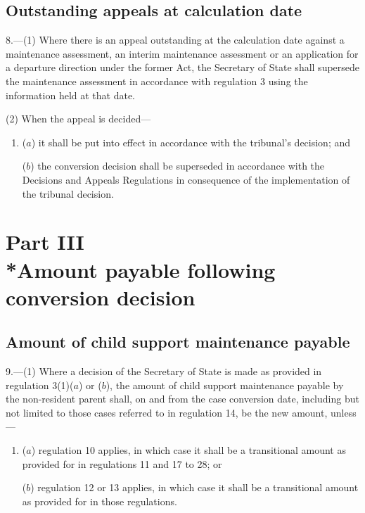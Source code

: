 \documentclass[12pt,a4paper]{article}
\begin{document}
\subsection[8. Outstanding appeals at calculation date]{Outstanding appeals at calculation date}

8.---(1)  Where there is an appeal outstanding at the calculation date against a maintenance assessment, an interim maintenance assessment or an application for a departure direction under the former Act, the Secretary of State shall supersede the maintenance assessment in accordance with regulation 3 using the information held at that date.

(2) When the appeal is decided—
\begin{enumerate}\item[]
($a$) it shall be put into effect in accordance with the tribunal’s decision; and

($b$) the conversion decision shall be superseded in accordance with the Decisions and Appeals Regulations in consequence of the implementation of the tribunal decision.
\end{enumerate}

\section[Part III --- Amount payable following conversion decision]{Part III\\*Amount payable following conversion decision}

\renewcommand\parthead{--- Part III}

\subsection[9. Amount of child support maintenance payable]{Amount of child support maintenance payable}

9.---(1)  Where a decision of the Secretary of State is made as provided in regulation 3(1)($a$)  or ($b$), the amount of child support maintenance payable by the non-resident parent shall, on and from the case conversion date, including but not limited to those cases referred to in regulation 14, be the new amount, 
unless—
\begin{enumerate}\item[]
    ($a$) 
    regulation 10 applies, in which case it shall be a transitional amount as provided for in regulations 11 and 17 to 28; or

    ($b$) 
    regulation 12 or 13 applies, in which case it shall be a transitional amount as provided for in those regulations.
\end{enumerate}  %
\end{document}
